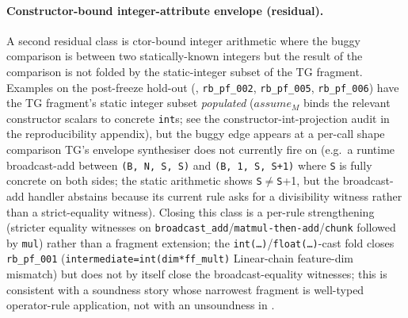\paragraph{Constructor-bound integer-attribute envelope (residual).}
A second residual class is ctor-bound integer arithmetic
where the buggy comparison is between two statically-known
integers but the result of the comparison is not folded by
the static-integer subset of the \textsc{TG} fragment. Examples
on the post-freeze hold-out
(, \texttt{rb\_pf\_002},
\texttt{rb\_pf\_005}, \texttt{rb\_pf\_006}) have the
\textsc{TG} fragment's static integer subset \emph{populated}
($\mathit{assume}_M$ binds the relevant constructor scalars
to concrete \texttt{int}s; see the constructor-int-projection
audit in the reproducibility appendix),
but the buggy edge appears at a per-call shape comparison
\textsc{TG}'s envelope synthesiser does not currently fire
on (e.g.\ a runtime broadcast-add between
\texttt{(B, N, S, S)} and \texttt{(B, 1, S, S{+}1)} where
\texttt{S} is fully concrete on both sides; the static
arithmetic shows \texttt{S}$\ne$\texttt{S}{+}1, but the
broadcast-add handler abstains because its current rule
asks for a divisibility witness rather than a strict-equality
witness). Closing this class is a per-rule strengthening
(stricter equality witnesses on
\texttt{broadcast\_add}/\texttt{matmul-then-add}/\texttt{chunk}
followed by \texttt{mul}) rather than a fragment extension;
the \texttt{int(\ldots)}/\texttt{float(\ldots)}-cast
fold closes
\texttt{rb\_pf\_001} (\texttt{intermediate=int(dim*ff\_mult)}
Linear-chain feature-dim mismatch) but does not by itself
close the broadcast-equality witnesses; this is consistent
with a soundness story whose narrowest fragment is well-typed
operator-rule application, not with an unsoundness in
.

